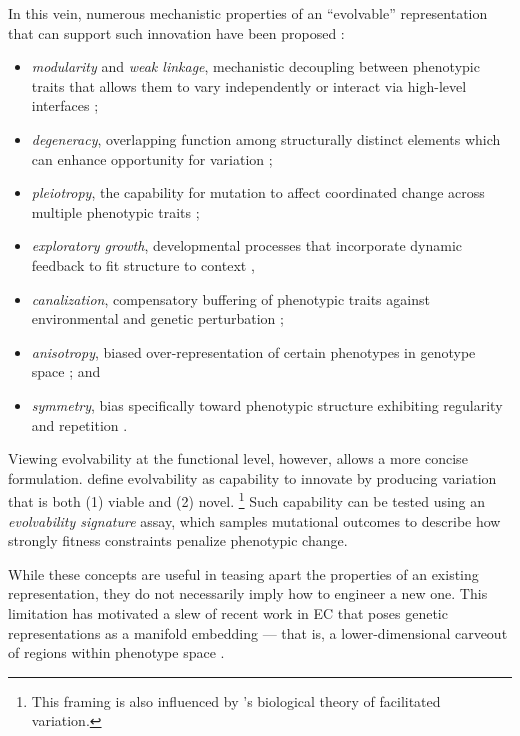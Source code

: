In this vein, numerous  mechanistic properties of an ``evolvable'' representation that can support such innovation have been proposed \citep{moreno2017evolvability}:
\begin{itemize}
\item \textit{modularity} and \textit{weak linkage}, mechanistic decoupling between phenotypic traits that allows them to vary independently or interact via high-level interfaces \citep{kirschner1998evolvability,downing2015intelligence,kashtan2005spontaneous,kashtan2007varying,wilder2015reconciling,owens2003quest};
\item \textit{degeneracy}, overlapping function among structurally distinct elements which can enhance opportunity for variation \citep{whitacre2010degeneracy,wagner2003evolutionary};
\item \textit{pleiotropy}, the capability for mutation to affect coordinated change across multiple phenotypic traits \citep{rimbault2013derived,cheney2014unshackling};
\item \textit{exploratory growth}, developmental processes that incorporate dynamic feedback to fit structure to context \citep{kirschner1998evolvability,downing2015intelligence},
\item \textit{canalization}, compensatory buffering of phenotypic traits against environmental and genetic perturbation \citep{gibson2004uncovering,paaby2014cryptic};
\item \textit{anisotropy}, biased over-representation of certain phenotypes in genotype space \citep{schaper2014arrival,borenstein2008end,brunusan2025minimal,rohner2025macroevolution,herreralvarez2025structure}; and
\item \textit{symmetry}, bias specifically toward phenotypic structure exhibiting regularity and repetition \citep{coyne1987lack,clune2011performance,tonelli2013relationships,cheney2014unshackling}.
\end{itemize}
Viewing evolvability at the functional level, however, allows a more concise formulation.
\citet{tarapore2015evolvability} define evolvability as capability to innovate by producing variation that is both (1) viable and (2) novel.
\unskip\footnote{%
This framing is also influenced by \citet{kirschner2017plausibility}'s biological theory of facilitated variation.
}
Such capability can be tested using an \textit{evolvability signature} assay, which samples mutational outcomes to describe how strongly fitness constraints penalize phenotypic change.

While these concepts are useful in teasing apart the properties of an existing representation, they do not necessarily imply how to engineer a new one.
This limitation has motivated a slew of recent work in EC that poses genetic representations as a manifold embedding \citep{lehman2023evolution,moreno2018learning,bentley2022evolving,gaier2020discovering,wittenberg2023denoising,bontrager2018deepmasterprints,rodrigueztorrado2020bootstrapping,volz2018evolving,rakicevic2021policy,thakkar2019autoencoder,yosinski2012visually,feng2017autoencoding,stuurman2023approach,li2024generating,song2024morphvae}  --- that is, a lower-dimensional carveout of regions within phenotype space \citep{tenenbaum2000global,roweis2000nonlinear}.

